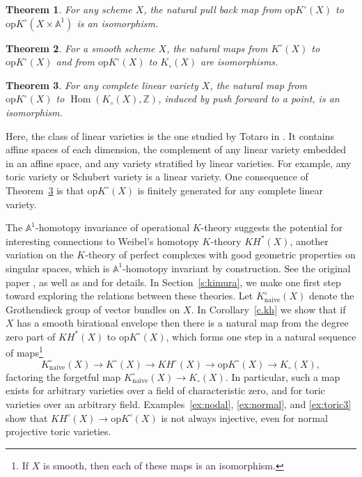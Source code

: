 \documentclass[11pt]{amsart}
\newtheorem{theorem}{Theorem}[section]
\theoremstyle{definition}
\begin{document}
\begin{theorem}\label{t:intro-homotopy}
For any scheme $X$, the natural pull back map from ${\mathrm{op}K}^\circ(X)$ to ${\mathrm{op}K}^\circ(X \times {\mathbb{A}}^1)$ is an isomorphism.
\end{theorem}

\begin{theorem} \label{t:intro-smooth}
For a smooth scheme $X$, the natural maps from $K^\circ(X)$ to ${\mathrm{op}K}^\circ(X)$ and from ${\mathrm{op}K}^\circ(X)$ to $K_\circ(X)$ are isomorphisms. 
\end{theorem}

\begin{theorem} \label{t:simple-duality}
For any complete linear variety $X$, the natural map from ${\mathrm{op}K}^\circ(X)$ to $\operatorname{Hom}(K_\circ(X), {\mathbb{Z}})$, induced by push forward to a point, is an isomorphism.
\end{theorem}

\noindent Here, the class of linear varieties is the one studied by Totaro in \cite{totaro}.  It contains affine spaces of each dimension, the complement of any linear variety embedded in an affine space, and any variety stratified by linear varieties.  For example, any toric variety or Schubert variety is a linear variety.  One consequence of Theorem~\ref{t:simple-duality} is that ${\mathrm{op}K}^\circ(X)$ is finitely generated for any complete linear variety. 

The ${\mathbb{A}}^1$-homotopy invariance of operational  $K$-theory suggests the potential for interesting connections to Weibel's homotopy $K$-theory $KH^*(X)$, another variation on the $K$-theory of perfect complexes with good geometric properties on singular spaces, which is ${\mathbb{A}}^1$-homotopy invariant by construction.  See the original paper \cite{weibelKH}, as well as \cite[\S IV.12]{weibel} and \cite{haesemeyer} for details.  In Section~\ref{s:kimura}, we make one first step toward exploring the relations between these theories.  Let $K^\circ_{\mathrm{naive}}(X)$ denote the Grothendieck group of vector bundles on $X$.  In Corollary~\ref{c.kh} we show that if $X$ has a smooth birational envelope then there is a natural map from the degree zero part of $KH^*(X)$ to ${\mathrm{op}K}^\circ(X)$, which forms one step in a natural sequence of maps\footnote{If $X$ is smooth, then each of these maps is an isomorphism.}
\[
  K^\circ_{\mathrm{naive}}(X) \to K^\circ(X) \to KH^\circ(X) \to {\mathrm{op}K}^\circ(X) \to K_\circ(X),
\]
factoring the forgetful map $K^\circ_{\mathrm{naive}}(X) \rightarrow K_\circ(X)$.  In particular, such a map exists for arbitrary varieties over a field of characteristic zero, and for toric varieties over an arbitrary field.  Examples~\ref{ex:nodal}, \ref{ex:normal}, and \ref{ex:toric3} show that $KH^\circ(X) \to {\mathrm{op}K}^\circ(X)$ is not always injective, even for normal projective toric varieties.
\end{document}

